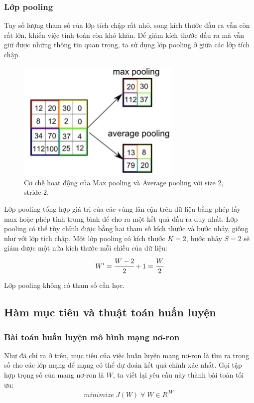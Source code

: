 \documentclass[12pt]{extreport}
\begin{document}
\subsubsection{Lớp pooling}

Tuy số lượng tham số của lớp tích chập rất nhỏ, song kích thước đầu ra vẫn còn rất lớn, khiến việc tính toán còn khó khăn. Để giảm kích thước đầu ra mà vẫn giữ được những thông tin quan trọng, ta sử dụng lớp pooling ở giữa các lớp tích chập.

\begin{figure}[H]
    \centering
    \includegraphics[width=0.7\textwidth]{figure9.jpg}
    \caption{Cơ chế hoạt động của Max pooling và Average pooling với size 2, stride 2.}
\end{figure}

Lớp pooling tổng hợp giá trị của các vùng lân cận trên dữ liệu bằng phép lấy max hoặc phép tính trung bình để cho ra một kết quả đầu ra duy nhất. Lớp pooling có thể tùy chỉnh được bằng hai tham số kích thước và bước nhảy, giống như với lớp tích chập. Một lớp pooling có kích thước $ K = 2 $, bước nhảy $ S = 2 $ sẽ giảm được một nửa kích thước mỗi chiều của dữ liệu:
$$  W' = \cfrac{W - 2}{2} + 1 = \cfrac{W}{2} $$

Lớp pooling không có tham số cần học.

\subsection{Hàm mục tiêu và thuật toán huấn luyện}
\label{optimization}

\subsubsection{Bài toán huấn luyện mô hình mạng nơ-ron}

Như đã chỉ ra ở trên, mục tiêu của việc huấn luyện mạng nơ-ron là tìm ra trọng số cho các lớp mạng để mạng có thể dự đoán kết quả chính xác nhất. Gọi tập hợp trọng số của mạng nơ-ron là $ W $, ta viết lại yêu cầu này thành bài toán tối ưu:
$$ minimize \; J(W) \; \forall \; W \in R^{|W|} $$
\end{document}
